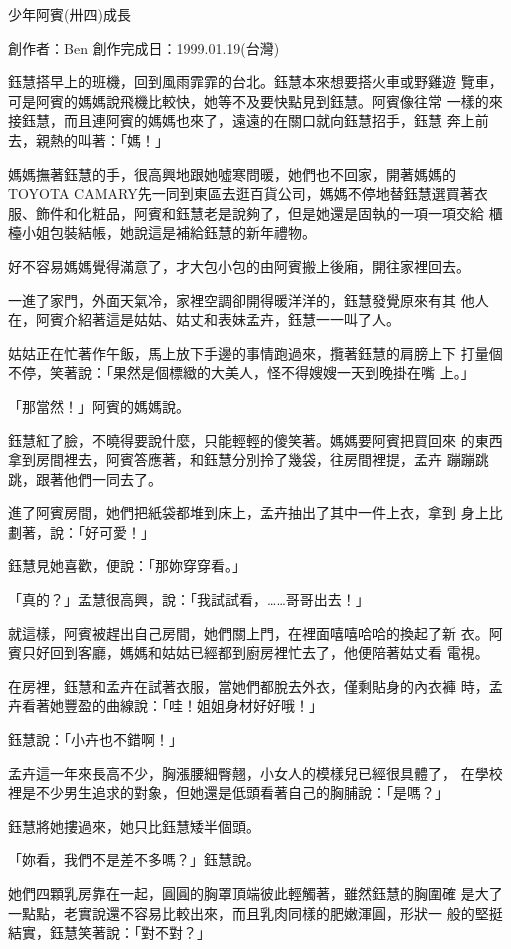 



少年阿賓(卅四)成長

創作者：Ben
創作完成日：1999.01.19(台灣)


鈺慧搭早上的班機，回到風雨霏霏的台北。鈺慧本來想要搭火車或野雞遊
覽車，可是阿賓的媽媽說飛機比較快，她等不及要快點見到鈺慧。阿賓像往常
一樣的來接鈺慧，而且連阿賓的媽媽也來了，遠遠的在關口就向鈺慧招手，鈺慧
奔上前去，親熱的叫著：「媽！」

媽媽撫著鈺慧的手，很高興地跟她噓寒問暖，她們也不回家，開著媽媽的
TOYOTA CAMARY先一同到東區去逛百貨公司，媽媽不停地替鈺慧選買著衣
服、飾件和化粧品，阿賓和鈺慧老是說夠了，但是她還是固執的一項一項交給
櫃檯小姐包裝結帳，她說這是補給鈺慧的新年禮物。

好不容易媽媽覺得滿意了，才大包小包的由阿賓搬上後廂，開往家裡回去。

一進了家門，外面天氣冷，家裡空調卻開得暖洋洋的，鈺慧發覺原來有其
他人在，阿賓介紹著這是姑姑、姑丈和表妹孟卉，鈺慧一一叫了人。

姑姑正在忙著作午飯，馬上放下手邊的事情跑過來，攬著鈺慧的肩膀上下
打量個不停，笑著說：「果然是個標緻的大美人，怪不得嫂嫂一天到晚掛在嘴
上。」

「那當然！」阿賓的媽媽說。

鈺慧紅了臉，不曉得要說什麼，只能輕輕的傻笑著。媽媽要阿賓把買回來
的東西拿到房間裡去，阿賓答應著，和鈺慧分別拎了幾袋，往房間裡提，孟卉
蹦蹦跳跳，跟著他們一同去了。

進了阿賓房間，她們把紙袋都堆到床上，孟卉抽出了其中一件上衣，拿到
身上比劃著，說：「好可愛！」

鈺慧見她喜歡，便說：「那妳穿穿看。」

「真的？」孟慧很高興，說：「我試試看，……哥哥出去！」

就這樣，阿賓被趕出自己房間，她們關上門，在裡面嘻嘻哈哈的換起了新
衣。阿賓只好回到客廳，媽媽和姑姑已經都到廚房裡忙去了，他便陪著姑丈看
電視。

在房裡，鈺慧和孟卉在試著衣服，當她們都脫去外衣，僅剩貼身的內衣褲
時，孟卉看著她豐盈的曲線說：「哇！姐姐身材好好哦！」

鈺慧說：「小卉也不錯啊！」

孟卉這一年來長高不少，胸漲腰細臀翹，小女人的模樣兒已經很具體了，
在學校裡是不少男生追求的對象，但她還是低頭看著自己的胸脯說：「是嗎？」

鈺慧將她摟過來，她只比鈺慧矮半個頭。

「妳看，我們不是差不多嗎？」鈺慧說。

她們四顆乳房靠在一起，圓圓的胸罩頂端彼此輕觸著，雖然鈺慧的胸圍確
是大了一點點，老實說還不容易比較出來，而且乳肉同樣的肥嫩渾圓，形狀一
般的堅挺結實，鈺慧笑著說：「對不對？」

